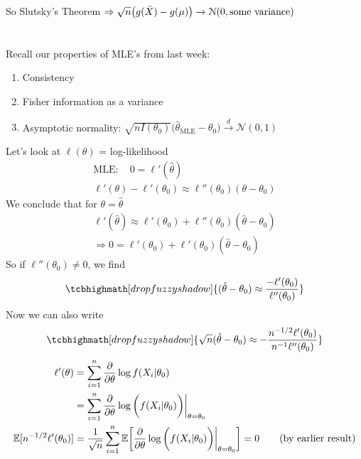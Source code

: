 So Slutsky's Theorem $\Rightarrow \sqrt{n} \big( g(\bar{X}) - g(\mu) \big) \rightarrow \mathcal{N}(0, \text{some variance})$\\
\redhline\\\\
Recall our properties of MLE's from last week:
\begin{enumerate}[label = \protect\circled{\arabic*}]
	\item Consistency
	\item Fisher information as a variance
	\item Asymptotic normality: $\sqrt{n I(\theta_0)} \bigg(\hat{\theta}_{\text{MLE}} - \theta_0 \bigg) \xrightarrow{d} \mathcal{N}(0, 1)$ 
\end{enumerate}
Let's look at $\ell (\theta)$ = log-likelihood
\begin{gather*}
	\text{MLE}: \quad 0 = \ell ' (\hat{\theta})\\
	\ell ' (\theta)  - \ell ' (\theta_0) \approx \ell '' (\theta_0) (\theta - \theta_0)
\end{gather*}
We conclude that for $\theta = \hat{\theta}$
\begin{gather*}
	\ell ' (\hat{\theta}) \approx \ell ' (\theta_0) + \ell '' (\theta_0) (\hat{\theta} - \theta_0)\\
	\Rightarrow 0 = \ell ' (\theta_0) + \boxed{\ell ' (\theta_0)} (\hat{\theta} - \theta_0)
\end{gather*}
So if $\ell '' (\theta_0) \neq 0$, we find 
\begin{equation*}
	\tcbhighmath[drop fuzzy shadow]{(\hat{\theta} - \theta_0) \approx \frac{ - \ell ' (\theta_0)}{\ell '' (\theta_0)}}
\end{equation*}
Now we can also write
\begin{gather*}
	\tcbhighmath[drop fuzzy shadow]{\sqrt{n}(\hat{\theta} - \theta_0) \approx -\frac{n^{-1/2}\ell ' (\theta_0)}{n^{-1} \ell '' (\theta_0)}}
\end{gather*}
\begin{align*}
	\ell ' (\theta) & = \sum_{i=1}^n \frac{\partial}{\partial \theta} \log f(X_i | \theta_0)\\
	& = \sum_{i=1}^n \frac{\partial}{\partial \theta} \log \bigg( f(X_i | \theta_0) \bigg) \bigg|_{\theta = \theta_0}\\
	\Large{\mathbb{E}} [n^{-1/2}\ell ' (\theta_0)] & = \frac{1}{\sqrt{n}} \sum_{i=1}^n \mathbb{E} \bigg[ \frac{\partial}{\partial \theta} \log \bigg( f(X_i | \theta_0) \bigg) \bigg|_{\theta = \theta_0} \bigg] = 0 \tag{by earlier result}
\end{align*}
